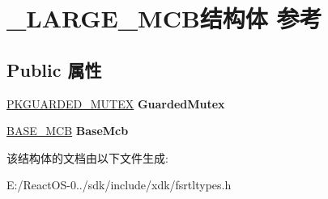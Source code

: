 \hypertarget{struct___l_a_r_g_e___m_c_b}{}\section{\+\_\+\+L\+A\+R\+G\+E\+\_\+\+M\+C\+B结构体 参考}
\label{struct___l_a_r_g_e___m_c_b}
\subsection*{Public 属性}
\begin{DoxyCompactItemize}
\item 
\mbox{\label{struct___l_a_r_g_e___m_c_b_a80a085bd9487e59b8c6e1bf7df71382e}} 
\hyperlink{struct___k_g_u_a_r_d_e_d___m_u_t_e_x}{P\+K\+G\+U\+A\+R\+D\+E\+D\+\_\+\+M\+U\+T\+EX} {\bfseries Guarded\+Mutex}
\item 
\mbox{\label{struct___l_a_r_g_e___m_c_b_acf4eccf3f5ec0450426f81b05a56c2bd}} 
\hyperlink{struct___b_a_s_e___m_c_b}{B\+A\+S\+E\+\_\+\+M\+CB} {\bfseries Base\+Mcb}
\end{DoxyCompactItemize}


该结构体的文档由以下文件生成\+:\begin{DoxyCompactItemize}
\item 
E\+:/\+React\+O\+S-\/0../sdk/include/xdk/fsrtltypes.\+h\end{DoxyCompactItemize}
